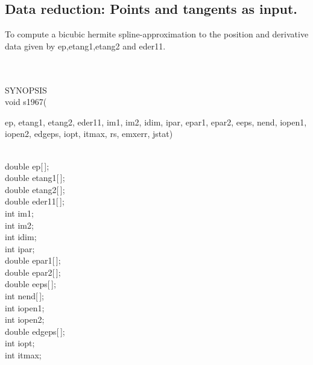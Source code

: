 \subsection{Data reduction: Points and tangents as input.}
\begin{minipg1}
To compute a bicubic hermite spline-approximation to the
           position and derivative data given by ep,etang1,etang2
           and eder11.
\end{minipg1} \\ \\
SYNOPSIS\\
        \> void s1967(\begin{minipg3}
            {\fov ep}, {\fov etang1}, {\fov etang2}, {\fov eder11}, {\fov im1}, {\fov im2}, {\fov idim}, {\fov ipar}, {\fov epar1}, {\fov epar2},
	    {\fov eeps}, {\fov nend}, {\fov iopen1}, {\fov iopen2}, {\fov edgeps}, {\fov iopt}, {\fov itmax}, {\fov rs}, {\fov emxerr}, {\fov jstat})
                \end{minipg3}\\
                \>\>    double \> {\fov ep}[\,];\\
                \>\>    double \> {\fov etang1}[\,];\\
                \>\>    double \> {\fov etang2}[\,];\\
                \>\>    double \> {\fov eder11}[\,];\\
                \>\>    int    \>  {\fov im1};\\
                \>\>    int    \>  {\fov im2};\\
                \>\>    int    \>  {\fov idim};\\
                \>\>    int    \>  {\fov ipar};\\
                \>\>    double \> {\fov epar1}[\,];\\
                \>\>    double \> {\fov epar2}[\,];\\
                \>\>    double \> {\fov eeps}[\,];\\
                \>\>    int    \>  {\fov nend}[\,];\\
                \>\>    int    \>  {\fov iopen1};\\
                \>\>    int    \>  {\fov iopen2};\\
                \>\>    double \> {\fov edgeps}[\,];\\
                \>\>    int    \>  {\fov iopt};\\
                \>\>    int    \>  {\fov itmax};\\
